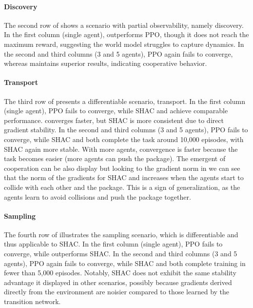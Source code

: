 \paragraph{Discovery} 
The second row of  shows a scenario with partial observability, namely discovery. In the first column (single agent), \fname{} outperforms PPO, though it does not reach the maximum reward, suggesting the world model struggles to capture dynamics. In the second and third columns (3 and 5 agents), PPO again fails to converge, whereas \fname{} maintains superior results, indicating cooperative behavior.

\paragraph{Transport}
The third row of  presents a differentiable scenario, transport. In the first column (single agent), PPO fails to converge, while SHAC and \fname{} achieve comparable performance. \fname{} converges faster, but SHAC is more consistent due to direct gradient stability. In the second and third columns (3 and 5 agents), PPO fails to converge, while SHAC and \fname{} both complete the task around 10,000 episodes, with SHAC again more stable. 
With more agents, convergence is faster because the task becomes easier (more agents can push the package).
The emergent of cooperation can be also display but looking to the gradient norm in  we can see that the norm of the gradients for SHAC and \fname{} increases when the agents start to collide with each other and the package. This is a sign of generalization, as the agents learn to avoid collisions and push the package together.

\paragraph{Sampling}
The fourth row of  illustrates the sampling scenario, which is differentiable and thus applicable to SHAC. In the first column (single agent), PPO fails to converge, while \fname{} outperforms SHAC. In the second and third columns (3 and 5 agents), PPO again fails to converge, while SHAC and \fname{} both complete training in fewer than 5,000 episodes. Notably, SHAC does not exhibit the same stability advantage it displayed in other scenarios, possibly because gradients derived directly from the environment are noisier compared to those learned by the transition network.
